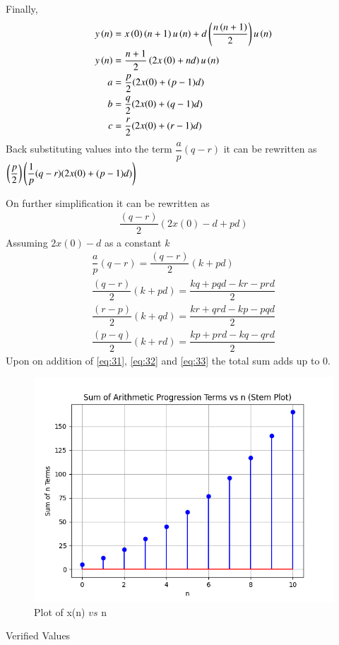 \documentclass[journal,12pt,twocolumn]{IEEEtran}
\theoremstyle{remark}
\begin{document}
Finally,
\begin{align}
    y\left(n\right)&=x\left(0\right)\left(n+1\right)u\left(n\right)+d\left(\dfrac{{n\left(n+1\right)}}{2}\right)u\left(n\right)\\
    y\left(n\right)&=\dfrac{n+1}{2}\left(2x\left(0\right)+nd\right)u\left(n\right)\\
    a&=\dfrac{p}{2}(2x(0)+(p-1)d)\\
    b&=\dfrac{q}{2}(2x(0)+(q-1)d)\\
    c&=\dfrac{r}{2}(2x(0)+(r-1)d)
\end{align}
Back substituting values into the term $\dfrac{a}{p}(q-r)$ it can be rewritten as $\left(\dfrac{p}{2}\right)\left(\dfrac{1}{p}(q-r)(2x(0)+(p-1)d)\right)$

On further simplification it can be rewritten as 
\begin{align}
    \dfrac{(q-r)}{2}(2x(0)-d+pd)
\end{align}
Assuming $2x(0)-d$ as a constant $k$
\begin{align}
    \dfrac{a}{p}(q-r) = \dfrac{(q-r)}{2}(k+pd)\\
    \dfrac{(q-r)}{2}(k+pd) = \dfrac{kq+pqd-kr-prd}{2}\label{eq:31}\\
    \dfrac{(r-p)}{2}(k+qd) = \dfrac{kr+qrd-kp-pqd}{2}\label{eq:32}\\
    \dfrac{(p-q)}{2}(k+rd) = \dfrac{kp+prd-kq-qrd}{2}\label{eq:33}
\end{align}
Upon on addition of \eqref{eq:31}, \eqref{eq:32} and \eqref{eq:33} the total sum adds up to 0.
\begin{figure}[ht]
    \centering
    \includegraphics[width=\columnwidth]{figs/figure_1.png}
    \caption{Plot of x(n) $vs$ n}
    \label{fig:11.9.2.11.2}
\end{figure}
\begin{table}[ht]
    \centering
    \def\arraystretch{1.5}
    
    \caption{Verified Values}
    \label{tab:11.9.2.11.3}
\end{table}
\end{document}
